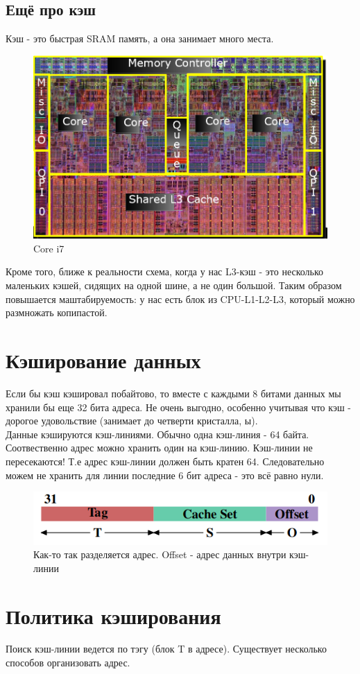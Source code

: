\documentclass[12pt, a4paper]{article}
\begin{document}
\subsection{Ещё про кэш}
Кэш - это быстрая SRAM память, а она занимает много места.\\ 
\begin{figure}[h]
    \centering
    \includegraphics[width=0.6\linewidth]{./images/Core.png}
    \caption{Core i7}
    \label{fig:Core}
\end{figure}
Кроме того, ближе к реальности схема, когда у нас L3-кэш - это несколько маленьких кэшей, сидящих на одной шине, а не один большой. Таким образом повышается маштабируемость: у нас есть блок из CPU-L1-L2-L3, который можно размножать копипастой.
\section{Кэширование данных}
Если бы кэш кэшировал побайтово, то вместе с каждыми 8 битами данных мы хранили бы еще 32 бита адреса. Не очень выгодно, особенно учитывая что кэш - дорогое удовольствие (занимает до четверти кристалла, ы).\\
Данные кэшируются кэш-линиями. Обычно одна кэш-линия - 64 байта. Соотвественно адрес можно хранить один на кэш-линию. Кэш-линии не пересекаются! Т.е адрес кэш-линии должен быть кратен 64. Следовательно можем не хранить для линии последние 6 бит адреса - это всё равно нули.
\begin{figure}[h]
    \centering
    \includegraphics[width=0.6\linewidth]{./images/lineADDR.png}
    \caption{Как-то так разделяется адрес. Offset - адрес данных внутри кэш-линии}
    \label{fig:lineADDR}
\end{figure}
\section{Политика кэширования}
Поиск кэш-линии ведется по тэгу (блок T в адресе). Существует несколько способов организовать адрес.
\end{document}
